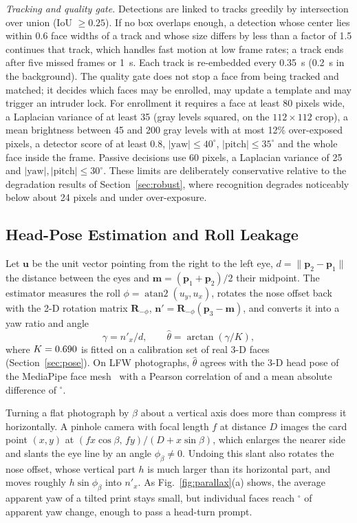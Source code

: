 \documentclass[journal]{IEEEtran}
\begin{document}
\emph{Tracking and quality gate.} Detections are linked to tracks greedily by intersection over union (IoU $\ge0.25$). If no box overlaps enough, a detection whose center lies within 0.6 face widths of a track and whose size differs by less than a factor of 1.5 continues that track, which handles fast motion at low frame rates; a track ends after five missed frames or 1~s. Each track is re-embedded every 0.35~s (0.2~s in the background). The quality gate does not stop a face from being tracked and matched; it decides which faces may be enrolled, may update a template and may trigger an intruder lock. For enrollment it requires a face at least 80 pixels wide, a Laplacian variance of at least 35 (gray levels squared, on the $112\times112$ crop), a mean brightness between 45 and 200 gray levels with at most 12\% over-exposed pixels, a detector score of at least 0.8, $|\text{yaw}|\le40^\circ$, $|\text{pitch}|\le35^\circ$ and the whole face inside the frame. Passive decisions use 60 pixels, a Laplacian variance of 25 and $|\text{yaw}|,|\text{pitch}|\le30^\circ$. These limits are deliberately conservative relative to the degradation results of Section~\ref{sec:robust}, where recognition degrades noticeably below about 24 pixels and under over-exposure.

\subsection{Head-Pose Estimation and Roll Leakage}\label{sec:yaw}
Let $\mathbf{u}$ be the unit vector pointing from the right to the left eye, $d=\lVert\mathbf{p}_2-\mathbf{p}_1\rVert$ the distance between the eyes and $\mathbf{m}=(\mathbf{p}_1+\mathbf{p}_2)/2$ their midpoint. The estimator measures the roll $\phi=\operatorname{atan2}(u_y,u_x)$, rotates the nose offset back with the 2-D rotation matrix $\mathbf{R}_{-\phi}$, $\mathbf{n}'=\mathbf{R}_{-\phi}(\mathbf{p}_3-\mathbf{m})$, and converts it into a yaw ratio and angle
\begin{equation}
\gamma = n'_x/d,\qquad \hat{\theta}=\arctan(\gamma/K),
\end{equation}
where $K=0.690$ is fitted on a calibration set of real 3-D faces (Section~\ref{sec:pose}). On \poseN{} LFW photographs, $\hat\theta$ agrees with the 3-D head pose of the MediaPipe face mesh~\cite{kartynnik2019facemesh} with a Pearson correlation of \poseR{} and a mean absolute difference of \poseMae$^\circ$.

Turning a flat photograph by $\beta$ about a vertical axis does more than compress it horizontally. A pinhole camera with focal length $f$ at distance $D$ images the card point $(x,y)$ at $(f x\cos\beta,\, f y)/(D+x\sin\beta)$, which enlarges the nearer side and slants the eye line by an angle $\phi_\beta\neq0$. Undoing this slant also rotates the nose offset, whose vertical part $h$ is much larger than its horizontal part, and moves roughly $h\sin\phi_\beta$ into $n'_x$. As Fig.~\ref{fig:parallax}(a) shows, the average apparent yaw of a tilted print stays small, but individual faces reach \parFlatRatioMax$^\circ$ of apparent yaw change, enough to pass a head-turn prompt.
\end{document}
